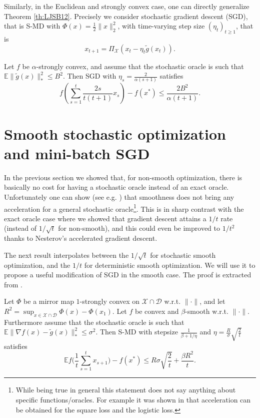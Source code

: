 \documentclass[openany]{now}
\newcommand{\tg}{\tilde{g}}
\newcommand{\E}{\mathbb{E}}
\newcommand{\cX}{\mathcal{X}}
\renewcommand{\tilde}{\widetilde}
\begin{document}
Similarly, in the Euclidean and strongly convex case, one can directly generalize Theorem \ref{th:LJSB12}. Precisely we consider stochastic gradient descent (SGD), that is S-MD with $\Phi(x) = \frac12 \|x\|_2^2$, with time-varying step size $(\eta_t)_{t \geq 1}$, that is
$$x_{t+1} = \Pi_{\cX}(x_t - \eta_t \tg(x_t)) .$$
\begin{theorem} \label{th:sgdstrong}
Let $f$ be $\alpha$-strongly convex, and assume that the stochastic oracle is such that $\E \|\tg(x)\|_*^2 \leq B^2$. Then SGD with $\eta_s = \frac{2}{\alpha (s+1)}$ satisfies
$$f \left(\sum_{s=1}^t \frac{2 s}{t(t+1)} x_s \right) - f(x^*) \leq \frac{2 B^2}{\alpha (t+1)} .$$
\end{theorem}

\section{Smooth stochastic optimization and mini-batch SGD}
In the previous section we showed that, for non-smooth optimization, there is basically no cost for having a stochastic oracle instead of an exact oracle. Unfortunately one can show (see e.g. \cite{Tsy03}) that smoothness does not bring any acceleration for a general stochastic oracle\footnote{While being true in general this statement does not say anything about specific functions/oracles. For example it was shown in \cite{BM13} that acceleration can be obtained for the square loss and the logistic loss.}. This is in sharp contrast with the exact oracle case where we showed that gradient descent attains a $1/t$ rate (instead of $1/\sqrt{t}$ for non-smooth), and this could even be improved to $1/t^2$ thanks to Nesterov's accelerated gradient descent. 

The next result interpolates between the $1/\sqrt{t}$ for stochastic smooth optimization, and the $1/t$ for deterministic smooth optimization. We will use it to propose a useful modification of SGD in the smooth case. The proof is extracted from \cite{DGBSX12}.

\begin{theorem} \label{th:SMDsmooth}
Let $\Phi$ be a mirror map $1$-strongly convex on $\mathcal{X} \cap \mathcal{D}$ w.r.t. $\|\cdot\|$, and let $R^2 = \sup_{x \in \mathcal{X} \cap \mathcal{D}} \Phi(x) - \Phi(x_1)$. Let $f$ be convex and $\beta$-smooth w.r.t. $\|\cdot\|$. Furthermore assume that the stochastic oracle is such that $\E \|\nabla f(x) - \tg(x)\|_*^2 \leq \sigma^2$. Then S-MD with stepsize $\frac{1}{\beta + 1/\eta}$ and $\eta = \frac{R}{\sigma} \sqrt{\frac{2}{t}}$ satisfies
$$\E f\bigg(\frac{1}{t} \sum_{s=1}^t x_{s+1} \bigg) - f(x^*) \leq R \sigma \sqrt{\frac{2}{t}} + \frac{\beta R^2}{t} .$$
\end{theorem}
\end{document}
